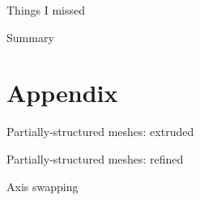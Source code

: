 \documentclass{beamer}
\begin{document}
\begin{frame}{Things I missed}
\end{frame}

\begin{frame}{Summary}

\end{frame}


\section{Appendix}

\begin{frame}{Partially-structured meshes: extruded}

\end{frame}

\begin{frame}{Partially-structured meshes: refined}

\end{frame}

\begin{frame}{Axis swapping}

\end{frame}
\end{document}
